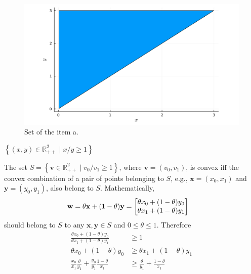 \documentclass[12pt,a4paper]{article}
\begin{document}
\begin{figure}[H]
    \centering
    \includegraphics[scale=0.08]{figs/2.8a.png}
    \caption{Set of the item a.}
    \label{fig:2.8a}
\end{figure}

\subproblem \(\left\{ (x,y) \in \mathbb{R}_{++}^{2} \mid x/y \geq 1 \right\}\)
\subanswer

The set \(S = \left\{ \mathbf{v} \in \mathbb{R}_{++}^{2} \mid v_0/v_1 \geq 1 \right\}\), where \(\mathbf{v} = (v_0, v_1)\), is convex iff the convex combination of a pair of points belonging to \(S\), e.g., \(\mathbf{x} = (x_0, x_1)\) and \(\mathbf{y} = (y_0, y_1)\), also belong to \(S\). Mathematically,
\begin{align}
    \mathbf{w} & = \theta \mathbf{x} + (1-\theta)\mathbf{y} = \mqty[\theta x_0 + (1 - \theta)y_0 \\ \theta x_1 + (1 - \theta)y_1]
\end{align}
should belong to \(S\) to any \(\mathbf{x}, \mathbf{y} \in S\) and \(0\leq\theta\leq 1\). Therefore
\begin{align}
    \frac{\theta x_0 + (1 - \theta)y_0}{\theta x_1 + (1 - \theta)y_1} & \geq 1\\
    \theta x_0 + (1 - \theta)y_0 & \geq \theta x_1 + (1 - \theta)y_1 \\
    \frac{x_0}{x_1}\frac{\theta}{y_1} + \frac{y_0}{y_1} \frac{1 - \theta}{x_1} & \geq \frac{\theta}{y_1} + \frac{1 - \theta}{x_1}
\end{align}
\end{document}
